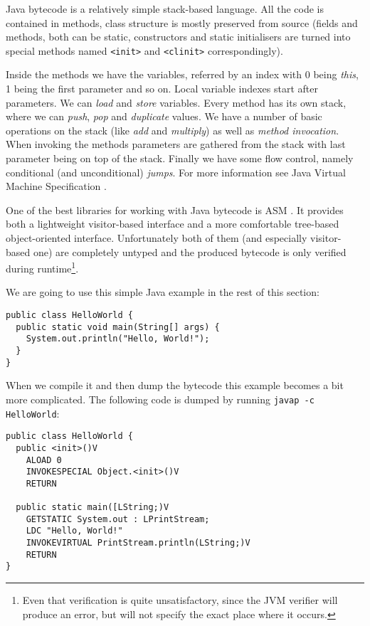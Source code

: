 \documentclass{sig-alternate}
\begin{document}
Java bytecode is a relatively simple stack-based language. All the code is contained in methods, class structure is mostly preserved from source (fields and methods, both can be static, constructors and static initialisers are turned into special methods named \verb!<init>! and \verb!<clinit>! correspondingly). 

Inside the methods we have the variables, referred by an index with $0$ being \emph{this}, 1 being the first parameter and so on. Local variable indexes start after parameters. We can \emph{load} and \emph{store} variables. Every method has its own  stack, where we can \emph{push}, \emph{pop} and \emph{duplicate} values. We have a number of basic operations on the stack (like \emph{add} and \emph{multiply}) as well as \emph{method invocation}. When invoking the methods parameters are gathered from the stack with last parameter being on top of the stack. Finally we have some flow control, namely conditional (and unconditional) \emph{jumps}. For more information see Java Virtual Machine Specification \cite{lindholm1999jvm}.

One of the best libraries for working with Java bytecode is ASM \cite{bruneton2002acm}. It provides both a lightweight visitor-based interface and a more comfortable tree-based object-oriented interface. Unfortunately both of them (and especially visitor-based one) are completely untyped and the produced bytecode is only verified during runtime\footnote{Even that verification is quite unsatisfactory, since the JVM verifier will produce an error, but will not specify the exact place where it occurs.}.

We are going to use this simple Java example in the rest of this section:

\begin{verbatim}
public class HelloWorld {
  public static void main(String[] args) {
    System.out.println("Hello, World!");
  }
}
\end{verbatim}

When we compile it and then dump the bytecode this example becomes a bit more complicated. The following code is dumped by running \verb!javap -c HelloWorld!:

\begin{verbatim}
public class HelloWorld {
  public <init>()V
    ALOAD 0
    INVOKESPECIAL Object.<init>()V
    RETURN
  
  public static main([LString;)V
    GETSTATIC System.out : LPrintStream;
    LDC "Hello, World!"
    INVOKEVIRTUAL PrintStream.println(LString;)V
    RETURN
}
\end{verbatim}
\end{document}
